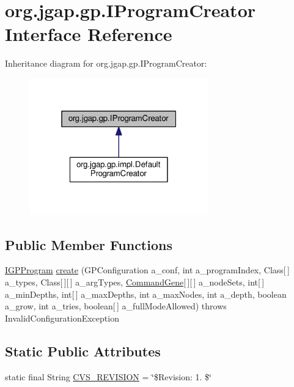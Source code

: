 \hypertarget{interfaceorg_1_1jgap_1_1gp_1_1_i_program_creator}{\section{org.\-jgap.\-gp.\-I\-Program\-Creator Interface Reference}
\label{interfaceorg_1_1jgap_1_1gp_1_1_i_program_creator}
}


Inheritance diagram for org.\-jgap.\-gp.\-I\-Program\-Creator\-:
\nopagebreak
\begin{figure}[H]
\begin{center}
\leavevmode
\includegraphics[width=220pt]{interfaceorg_1_1jgap_1_1gp_1_1_i_program_creator__inherit__graph}
\end{center}
\end{figure}
\subsection*{Public Member Functions}
\begin{DoxyCompactItemize}
\item 
\hyperlink{interfaceorg_1_1jgap_1_1gp_1_1_i_g_p_program}{I\-G\-P\-Program} \hyperlink{interfaceorg_1_1jgap_1_1gp_1_1_i_program_creator_aa5abec96de67f0af1bd1043d7235c07c}{create} (G\-P\-Configuration a\-\_\-conf, int a\-\_\-program\-Index, Class\mbox{[}$\,$\mbox{]} a\-\_\-types, Class\mbox{[}$\,$\mbox{]}\mbox{[}$\,$\mbox{]} a\-\_\-arg\-Types, \hyperlink{classorg_1_1jgap_1_1gp_1_1_command_gene}{Command\-Gene}\mbox{[}$\,$\mbox{]}\mbox{[}$\,$\mbox{]} a\-\_\-node\-Sets, int\mbox{[}$\,$\mbox{]} a\-\_\-min\-Depths, int\mbox{[}$\,$\mbox{]} a\-\_\-max\-Depths, int a\-\_\-max\-Nodes, int a\-\_\-depth, boolean a\-\_\-grow, int a\-\_\-tries, boolean\mbox{[}$\,$\mbox{]} a\-\_\-full\-Mode\-Allowed)  throws Invalid\-Configuration\-Exception
\end{DoxyCompactItemize}
\subsection*{Static Public Attributes}
\begin{DoxyCompactItemize}
\item 
static final String \hyperlink{interfaceorg_1_1jgap_1_1gp_1_1_i_program_creator_a9234470aef85eb0c69ae64455fd98dd2}{C\-V\-S\-\_\-\-R\-E\-V\-I\-S\-I\-O\-N} = \char`\"{}\$Revision\-: 1. \$\char`\"{}
\end{DoxyCompactItemize}


